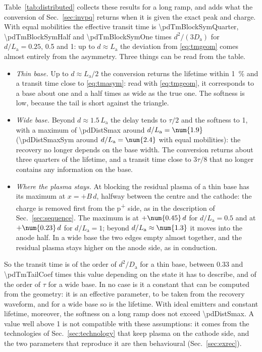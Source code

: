 \documentclass[10pt,a4paper]{scrartcl}
\newcommand{\Da}{D_\mathrm{a}}
\newcommand{\La}{L_\mathrm{a}}
\newcommand{\Pp}{p\textsuperscript{+}}
\begin{document}
Table~\ref{tab:distributed} collects these results for a long ramp, and adds what the conversion of Sec.~\ref{sec:invpq} returns when it is given the exact peak and charge. With equal mobilities the effective transit time is \num{\pdTmBlockSymQuarter}, \num{\pdTmBlockSymHalf} and \num{\pdTmBlockSymOne} times $d^2/(3\Da)$ for $d/\La = \num{0.25}$, \num{0.5} and 1: up to $d \approx \La$ the deviation from \eqref{eq:tmgeom} comes almost entirely from the asymmetry. Three things can be read from the table.
\begin{itemize}
\item \emph{Thin base.} Up to $d \approx \La/2$ the conversion returns the lifetime within \SI{1}{\percent} and a transit time close to \eqref{eq:tmasym}: read with \eqref{eq:tmgeom}, it corresponds to a base about one and a half times as wide as the true one. The softness is low, because the tail is short against the triangle.
\item \emph{Wide base.} Beyond $d \approx \num{1.5}\,\La$ the delay tends to $\tau/2$ and the softness to 1, with a maximum of \num{\pdDistSmax} around $d/\La = \num{\pdDistSmaxBeta}$ (\num{\pdDistSmaxSym} around $d/\La = \num{\pdDistSmaxBetaSym}$ with equal mobilities): the recovery no longer depends on the base width. The conversion returns about three quarters of the lifetime, and a transit time close to $3\tau/8$ that no longer contains any information on the base.
\item \emph{Where the plasma stays.} At blocking the residual plasma of a thin base has its maximum at $x = +B\,d$, halfway between the centre and the cathode: the charge is removed first from the \Pp{} side, as in the description of Sec.~\ref{sec:sequence}. The maximum is at $+\num{\pdTmPeakPosHalf}\,d$ for $d/\La = \num{0.5}$ and at $+\num{\pdTmPeakPosOne}\,d$ for $d/\La = 1$; beyond $d/\La \approx \num{\pdTmPeakZeroBeta}$ it moves into the anode half. In a wide base the two edges empty almost together, and the residual plasma stays higher on the anode side, as in conduction.
\end{itemize}

So the transit time is of the order of $d^2/\Da$ for a thin base, between \num{0.33} and \num{\pdTmTailCoef} times this value depending on the state it has to describe, and of the order of $\tau$ for a wide base. In no case is it a constant that can be computed from the geometry: it is an effective parameter, to be taken from the recovery waveform, and for a wide base so is the lifetime. With ideal emitters and constant lifetime, moreover, the softness on a long ramp does not exceed \num{\pdDistSmax}. A value well above 1 is not compatible with these assumptions: it comes from the technologies of Sec.~\ref{sec:technology} that keep plasma on the cathode side, and the two parameters that reproduce it are then behavioural (Sec.~\ref{sec:exrec}).
\end{document}
